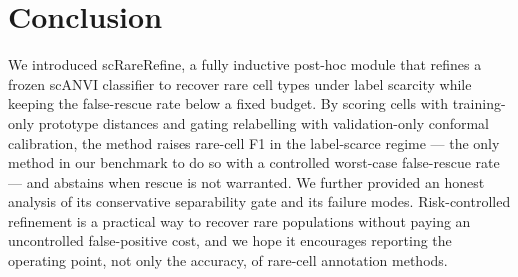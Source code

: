 \section{Conclusion}
\label{sec:conclusion}

We introduced scRareRefine, a fully inductive post-hoc module that refines a frozen scANVI classifier to recover
rare cell types under label scarcity while keeping the false-rescue rate below a fixed budget. By scoring cells with
training-only prototype distances and gating relabelling with validation-only conformal calibration, the method
raises rare-cell F1 in the label-scarce regime --- the only method in our benchmark to do so with a controlled
worst-case false-rescue rate --- and abstains when rescue is not warranted. We further provided an honest analysis of
its conservative separability gate and its failure modes. Risk-controlled refinement is a practical way to recover
rare populations without paying an uncontrolled false-positive cost, and we hope it encourages reporting the
operating point, not only the accuracy, of rare-cell annotation methods.
